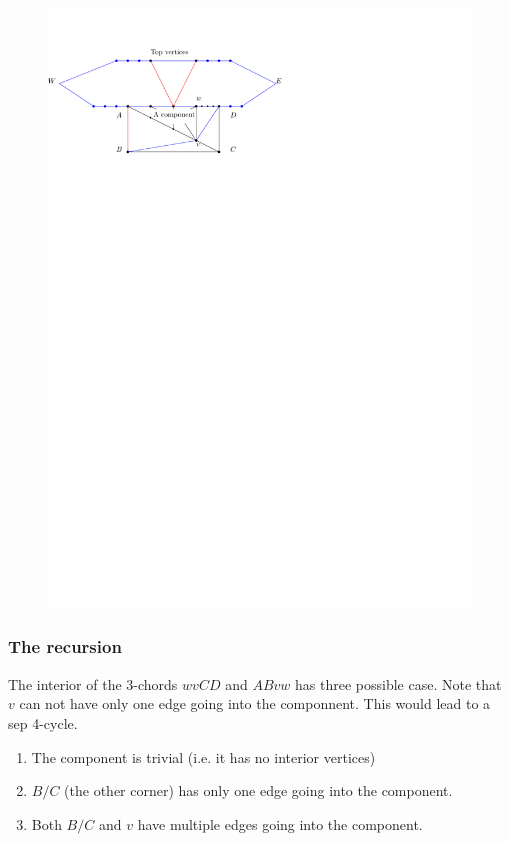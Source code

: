\begin{figure}[h]
  \centering
  \includegraphics[scale=1]{chordShrink/img/cOneEdge}
  \caption{}
  \label{fig:shrink:coneedge}
\end{figure}



\subsubsection{The recursion}
The interior of the $3$-chords $wvCD$ and $ABvw$ has three possible case. Note that $v$ can not have only one edge going into the componnent. This would lead to a sep 4-cycle.

\begin{enumerate}
  \item The component is trivial (i.e. it has no interior vertices)
  \item $B/C$ (the other corner) has only one edge going into the component.
  \item Both $B/C$ and $v$ have multiple edges going into the component.
\end{enumerate}


